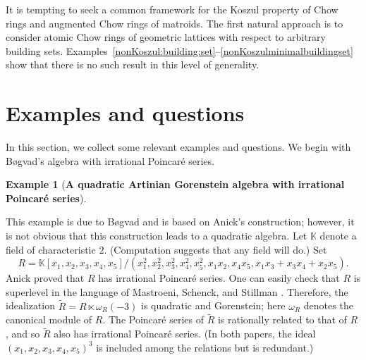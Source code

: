 \documentclass[11pt, reqno]{amsart}
\DeclareMathOperator{\coat}{coat}
\renewcommand{\emptyset}{\varnothing}
\newcommand{\kk}{\mathbb{K}}					%
\renewcommand{\tilde}[1]{\widetilde{#1}}
\theoremstyle{definition}
\newtheorem{example}[thm]{Example}
\numberwithin{equation}{section}
\numberwithin{table}{section}
\begin{document}
\begin{spacing}{1.1}

It is tempting to seek a common framework for the Koszul property of Chow rings and augmented Chow rings of matroids.  The first natural approach is to consider atomic Chow rings of geometric lattices with respect to arbitrary building sets.  Examples~\ref{nonKoszul:building:set}--\ref{nonKoszulminimalbuildingset} show that there is no such result in this level of generality.


\section{Examples and questions}\label{Sexamples}

In this section, we collect some relevant examples and questions.  We begin with B{\o}gvad's algebra with irrational Poincar\'e series.

\begin{example}[\textbf{A quadratic Artinian Gorenstein algebra with irrational Poincar\'{e} series}]\label{EXirrational}

This example is due to B{\o}gvad \cite{Bog83} and is based on Anick's \cite{Ani82} construction;  however, it is not obvious that this construction leads to a quadratic algebra.   Let $\kk$ denote a field of characteristic $2$.  (Computation suggests that any field will do.)  Set
\[R = \kk[x_1,x_2,x_3,x_4,x_5]/(x_1^2,x_2^2,x_3^2,x_4^2,x_5^2,x_1x_2,x_4x_5,x_1x_3+x_3x_4+x_2x_5).\]
Anick proved that $R$ has irrational Poincar\'{e} series.  One can easily check that $R$ is superlevel in the language of Mastroeni, Schenck, and Stillman \cite{MSS21}.  Therefore, the idealization $\tilde{R} = R \ltimes \omega_R(-3)$ is quadratic and Gorenstein; here $\omega_R$ denotes the canonical module of $R$.  The Poincar\'{e} series of $\tilde{R}$ is rationally related to that of $R$ \cite{Gul72}, and so $\tilde{R}$ also has irrational Poincar\'{e} series.  (In both papers, the ideal $(x_1,x_2,x_3,x_4,x_5)^3$ is included among the relations but is redundant.)
\end{example}



\end{spacing}
\end{document}
